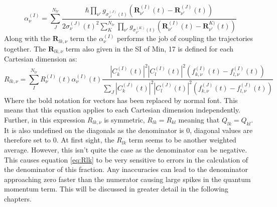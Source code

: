 \begin{equation}
  \alpha_{\nu}^{(I)} = \sum_{J}^{N_{tr}} \frac{\hbar \prod_{\nu'} g_{\sigma_{\nu'}^{(J)}(t)}\left(\mathbf{R}_{\nu'}^{(I)}(t) -         \mathbf{R}_{\nu'}^{(J)}(t)\right)}   {2 \sigma_{\nu}^{(J)}(t)^2\sum_{K}^{N_{tr}}\prod_{\nu'}                                           g_{\sigma_{\nu'}^{(K)}(t)}\left(\mathbf{R}_{\nu'}^{(I)}(t) - \mathbf{R}_{\nu'}^{K)}(t)\right)}
  \label{eq:alpha}
\end{equation}
Along with the $\mathbf{R}_{lk, \nu}$ term the $\alpha_{\nu}^{(I)}$ performs the job of coupling the trajectories together. The $\mathbf{R}_{lk, \nu}$ term also given in the SI of Min, 17\cite{min_ab_2017} is defined for each Cartesian dimension as:
\begin{equation}
  R_{lk, \nu} = \sum_{I}^{N_{tr}} R_{\nu}^{(I)}(t) \alpha_{\nu}^{(I)}(t) \frac{|C_{k}^{(I)}(t)|^2 |C_{l}^{(I)}(t)|^2 \left( f_{k,      \nu}^{(I)}(t) - f_{l, \nu}^{(I)}(t) \right)}{\sum_{J} |C_{k}^{(J)}(t)|^2 |C_{l}^{(J)}(t)|^2 \left( f_{k, \nu}^{(J)}(t) - f_{l,         \nu}^{(J)}(t) \right)}
  \label{eq:Rlk}
\end{equation}
Where the bold notation for vectors has been replaced by normal font. This means that this equation applies to each Cartesian dimension independently. Further, in this expression $R_{lk, \nu}$ is symmetric, $R_{lk} = R_{kl}$ meaning that $Q_{lk} = Q_{kl}$. It is also undefined on the diagonals as the denominator is 0, diagonal values are therefore set to 0. At first sight, the $R_{lk}$ term seems to be another weighted average. However, this isn't quite the case as the denominator can be negative. This causes equation \eqref{eq:Rlk} to be very sensitive to errors in the calculation of the denominator of this fraction. Any inaccuracies can lead to the denominator approaching zero faster than the numerator causing large spikes in the quantum momentum term. This will be discussed in greater detail in the following chapters.







